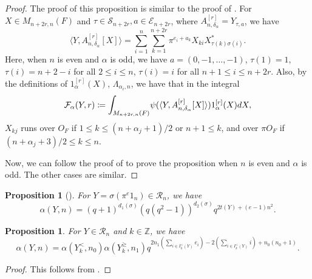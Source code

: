 \documentclass[11pt,oneside]{amsart}
\theoremstyle{plain}
\newtheorem{proposition}[theorem]{Proposition}
\theoremstyle{definition}
\theoremstyle{remark}
\newcommand{\BZ}{{\mathbb Z}}
\newcommand{\CE}{{\mathcal E}}
\newcommand{\CF}{{\mathcal F}}
\newcommand{\CR}{{\mathcal R}}
\newcommand{\CS}{{\mathcal S}}
\numberwithin{equation}{section}
\begin{document}
	\begin{proof}
		The proof of this proposition is similar to the proof of \cite[Lemma 3.15]{Cho}. For $X \in M_{n+2r,n}(F)$ and $\tau \in \CS_{n+2r}, a\in \CE_{n+2r}$, where $A_{n,\delta_{\alpha}}^{[r]}=Y_{\tau,a}$, we have
		\begin{equation*}
			\langle Y,A_{n,\delta_{\alpha}}^{[r]}[X] \rangle=\sum_{i=1}^{n}\sum_{k=1}^{n+2r}\pi^{e_i+a_k}X_{ki}X^*_{\tau(k)\sigma(i)}.
		\end{equation*}
		Here, when $n$ is even and $\alpha$ is odd, we have $a=(0,-1,\dots,-1)$, $\tau(1)=1$, $\tau(i)=n+2-i$ for all $2 \leq i \leq n$, $\tau(i)=i$ for all $n+1 \leq i \leq n+2r$. Also, by the definitions of $1_{\alpha}^{[r]}(X)$, $\Lambda_{\alpha_i,n}$, we have that in the integral
		\begin{equation*}
			\CF_{\alpha}(Y,r)\coloneqq \mathlarger{\int}_{M_{n+2r,n}(F)}\psi(\langle Y,A_{n,\delta_{\alpha}}^{[r]}[X] \rangle)1_{\alpha}^{[r]}(X)dX,
		\end{equation*}
		$X_{kj}$ runs over $O_F$ if $1 \leq k \leq (n+\alpha_j+1)/2$ or $n+1 \leq k$, and over $\pi O_F$ if $(n+\alpha_j+3)/2 \leq k \leq n$.
		
		Now, we can follow the proof of \cite[Lemma 3.15]{Cho} to prove the proposition when $n$ is even and $\alpha$ is odd. The other cases are similar.
	\end{proof}
	
	\begin{proposition}[{\cite[Proposition 2.2]{Hi}}]\label{proposition2.7} For $Y=\sigma (\pi^e1_n) \in \CR_n$, we have
		\begin{equation*}
			\alpha(Y,n)=(q+1)^{d_1(\sigma)}(q(q^2-1))^{d_2(\sigma)}q^{2t(Y)+(e-1)n^2}.
		\end{equation*}
		
	\end{proposition}
	\begin{proposition}\label{proposition2.8} For $Y \in \CR_n$ and $k \in \BZ$, we have
		\begin{equation*}
			\alpha(Y,n)=\alpha(Y^{<}_k,n_0)\alpha(Y^{\geq}_k,n_1)q^{2n_1(\sum_{i \in I_k^{<}(Y)}e_i)-2(\sum_{i \in I_k^{<}(Y)} i)+n_0(n_0+1)}.
		\end{equation*}
		
	\end{proposition}
	\begin{proof}
		This follows from \cite[Theorem 2.5]{Hi}.
	\end{proof}
	
	
	
\end{document}
